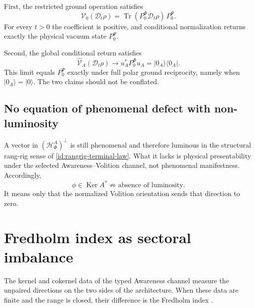 \documentclass[11pt,reqno]{scrartcl}
\newcommand{\PzeroP}{P_{0}^{\Psi}}
\newcommand{\PzeroF}{P_{0}^{\Phi}}
\newcommand{\polA}{u_A}
\newcommand{\ket}[1]{\lvert #1\rangle}
\newcommand{\bra}[1]{\langle #1\rvert}
\newcommand{\proj}[1]{\ket{#1}\!\bra{#1}}
\DeclareMathOperator{\Ker}{Ker}
\DeclareMathOperator{\Tr}{Tr}
\newcommand{\Decond}{\mathcal D}
\newcommand{\defectHF}{(\mathscr H_{\Phi}^{A})^{\perp}}
\newcommand{\returnOpCond}{\widehat{\mathcal V}_{A}}
\newcommand{\returnGroundOp}{\mathcal V_{0}}
\theoremstyle{plain}
\theoremstyle{definition}
\theoremstyle{remark}
\begin{document}
First, the restricted ground operation satisfies
\begin{equation}
  \returnGroundOp(\Decond_t\rho)
  =\Tr(\PzeroF\Decond_t\rho)\,\PzeroP.
  \label{eq:restricted-return-after-deconditioning}
\end{equation}
For every $t>0$ the coefficient is positive, and conditional normalization
returns exactly the physical vacuum state $\PzeroP$.

Second, the global conditional return satisfies
\begin{equation}
  \boxed{
  \returnOpCond(\Decond_t\rho)
  \longrightarrow
  \polA^*\PzeroF\polA
  =\proj{0_A}.}
  \label{eq:global-return-after-deconditioning}
\end{equation}
This limit equals $\PzeroP$ exactly under full polar ground reciprocity,
namely when $\ket{0_A}=\ket0$.  The two claims should not be conflated.

\subsection{No equation of phenomenal defect with non-luminosity}

A vector in $\defectHF$ is still phenomenal and therefore luminous in the
structural rang-rig sense of \cref{id:rangrig-terminal-law}.  What it
lacks is physical presentability under the selected Awareness--Volition
channel, not phenomenal manifestness.  Accordingly,
\begin{equation}
  \boxed{
  \phi\in\Ker A^*
  \not\Longrightarrow
  \text{absence of luminosity}.}
  \label{eq:excess-not-nonluminosity}
\end{equation}
It means only that the normalized Volition orientation sends that direction
to zero.
\section{Fredholm index as sectoral imbalance}
\label{sec:fredholm-index-excess}

The kernel and cokernel data of the typed Awareness channel measure the
unpaired directions on the two sides of the architecture.  When these data
are finite and the range is closed, their difference is the Fredholm index
\cite{Kato,ReedSimon}.
\end{document}
